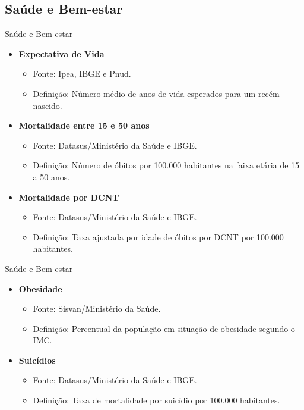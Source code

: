 \documentclass{beamer}
\begin{document}
\subsection{Saúde e Bem-estar}
\begin{frame}{Saúde e Bem-estar}
\begin{itemize}
    \item \textbf{Expectativa de Vida}
    \begin{itemize}
        \item Fonte: Ipea, IBGE e Pnud.
        \item Definição: Número médio de anos de vida esperados para um recém-nascido.
    \end{itemize}
    \item \textbf{Mortalidade entre 15 e 50 anos}
    \begin{itemize}
        \item Fonte: Datasus/Ministério da Saúde e IBGE.
        \item Definição: Número de óbitos por 100.000 habitantes na faixa etária de 15 a 50 anos.
    \end{itemize}
    \item \textbf{Mortalidade por DCNT}
    \begin{itemize}
        \item Fonte: Datasus/Ministério da Saúde e IBGE.
        \item Definição: Taxa ajustada por idade de óbitos por DCNT por 100.000 habitantes.
    \end{itemize}
\end{itemize}
\end{frame}


\begin{frame}{Saúde e Bem-estar}
\begin{itemize}
    \item \textbf{Obesidade}
    \begin{itemize}
        \item Fonte: Sisvan/Ministério da Saúde.
        \item Definição: Percentual da população em situação de obesidade segundo o IMC.
    \end{itemize}
    \item \textbf{Suicídios}
    \begin{itemize}
        \item Fonte: Datasus/Ministério da Saúde e IBGE.
        \item Definição: Taxa de mortalidade por suicídio por 100.000 habitantes.
    \end{itemize}
\end{itemize}
\end{frame}
\end{document}
